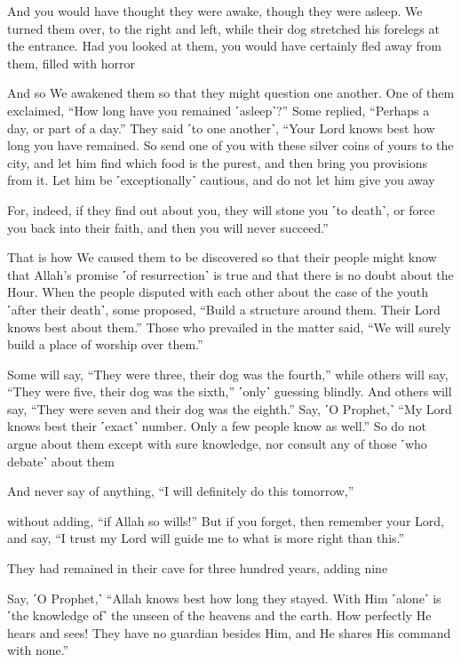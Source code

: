 And you would have thought they were awake, though they were asleep. We turned them over, to the right and left, while their dog stretched his forelegs at the entrance. Had you looked at them, you would have certainly fled away from them, filled with horror

And so We awakened them so that they might question one another. One of them exclaimed, “How long have you remained ˹asleep˺?” Some replied, “Perhaps a day, or part of a day.” They said ˹to one another˺, “Your Lord knows best how long you have remained. So send one of you with these silver coins of yours to the city, and let him find which food is the purest, and then bring you provisions from it. Let him be ˹exceptionally˺ cautious, and do not let him give you away

For, indeed, if they find out about you, they will stone you ˹to death˺, or force you back into their faith, and then you will never succeed.”

That is how We caused them to be discovered so that their people might know that Allah’s promise ˹of resurrection˺ is true and that there is no doubt about the Hour. When the people disputed with each other about the case of the youth ˹after their death˺, some proposed, “Build a structure around them. Their Lord knows best about them.” Those who prevailed in the matter said, “We will surely build a place of worship over them.”

Some will say, “They were three, their dog was the fourth,” while others will say, “They were five, their dog was the sixth,” ˹only˺ guessing blindly. And others will say, “They were seven and their dog was the eighth.” Say, ˹O Prophet,˺ “My Lord knows best their ˹exact˺ number. Only a few people know as well.” So do not argue about them except with sure knowledge, nor consult any of those ˹who debate˺ about them

And never say of anything, “I will definitely do this tomorrow,”

without adding, “if Allah so wills!” But if you forget, then remember your Lord, and say, “I trust my Lord will guide me to what is more right than this.”

They had remained in their cave for three hundred years, adding nine

Say, ˹O Prophet,˺ “Allah knows best how long they stayed. With Him ˹alone˺ is ˹the knowledge of˺ the unseen of the heavens and the earth. How perfectly He hears and sees! They have no guardian besides Him, and He shares His command with none.”

